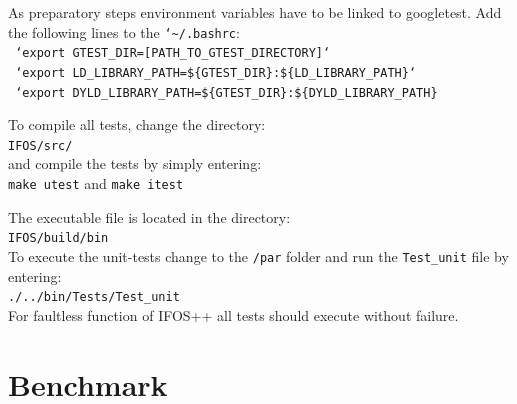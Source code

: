 \documentclass[pdftex,a4paper,parskip,listof=totoc,bibliography=totoc,onehalfspacing,12pt]{scrreprt}
\newcommand{\shellcmd}[1]{\indent\indent\texttt{#1}}	%
\newcommand{\shellcmdline}[1]{\indent\indent\texttt{\quad#1}} 	%
\begin{document}
As preparatory steps environment variables have to be linked to googletest. Add the following lines to the \shellcmd{{\char`\~}/.bashrc}:
\\\shellcmdline{ `export GTEST\_DIR=[PATH\_TO\_GTEST\_DIRECTORY]`}
\\\shellcmdline{ `export LD\_LIBRARY\_PATH=\$\{GTEST\_DIR\}:\$\{LD\_LIBRARY\_PATH\}`}
\\\shellcmdline{ `export DYLD\_LIBRARY\_PATH=\$\{GTEST\_DIR\}:\$\{DYLD\_LIBRARY\_PATH\}}

To compile all tests, change the directory: \\\shellcmdline{IFOS/src/} \\ and compile the tests by simply entering:\\\shellcmdline{make utest} and \shellcmdline{make itest}

The executable file is located in the directory:
\\\shellcmdline{IFOS/build/bin}\\
To execute the unit-tests change to the \shellcmd{/par} folder and run the \shellcmd{Test\_unit} file by entering:
\\\shellcmdline{./../bin/Tests/Test\_unit}\\ 
For faultless function of IFOS++ all tests should execute without failure.

\section{Benchmark}

\cleardoublepage
{}
\listoffigures
{}
\listoftables
{}
\cleardoublepage


\end{document}
